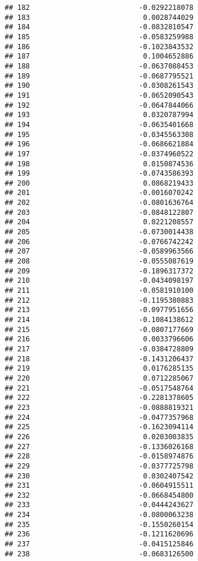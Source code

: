 \documentclass[
]{article}
\begin{document}
\begin{verbatim}
## 182                          -0.0292218078
## 183                           0.0028744029
## 184                          -0.0832810547
## 185                          -0.0583259988
## 186                          -0.1023843532
## 187                           0.1004652886
## 188                          -0.0637088453
## 189                          -0.0687795521
## 190                          -0.0308261543
## 191                          -0.0652090543
## 192                          -0.0647844066
## 193                           0.0320787994
## 194                          -0.0635401668
## 195                          -0.0345563308
## 196                          -0.0686621884
## 197                          -0.0374960522
## 198                           0.0150874536
## 199                          -0.0743586393
## 200                           0.0868219433
## 201                          -0.0016070242
## 202                          -0.0801636764
## 203                          -0.0848122807
## 204                           0.0221208557
## 205                          -0.0730014438
## 206                          -0.0766742242
## 207                          -0.0589963566
## 208                          -0.0555087619
## 209                          -0.1896317372
## 210                          -0.0434098197
## 211                          -0.0581910100
## 212                          -0.1195380883
## 213                          -0.0977951656
## 214                          -0.1084138612
## 215                          -0.0807177669
## 216                           0.0033796606
## 217                          -0.0384728809
## 218                          -0.1431206437
## 219                           0.0176285135
## 220                           0.0712285067
## 221                          -0.0517548764
## 222                          -0.2281378605
## 223                          -0.0888819321
## 224                          -0.0477357968
## 225                          -0.1623094114
## 226                           0.0203003835
## 227                          -0.1336026168
## 228                          -0.0158974876
## 229                          -0.0377725798
## 230                           0.0302407542
## 231                          -0.0604915511
## 232                          -0.0668454800
## 233                          -0.0444243627
## 234                          -0.0800063238
## 235                          -0.1550260154
## 236                          -0.1211620696
## 237                          -0.0415125846
## 238                          -0.0683126500

\end{verbatim}
\end{document}
